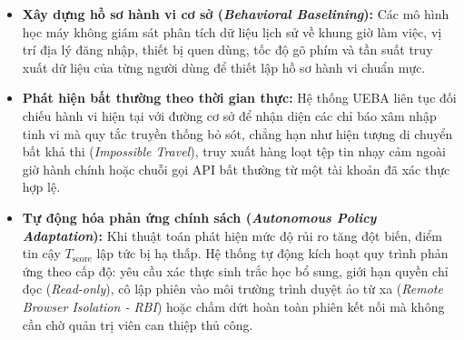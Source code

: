 \begin{itemize}
    \item \textbf{Xây dựng hồ sơ hành vi cơ sở (\textit{Behavioral Baselining}):} Các mô hình học máy không giám sát phân tích dữ liệu lịch sử về khung giờ làm việc, vị trí địa lý đăng nhập, thiết bị quen dùng, tốc độ gõ phím và tần suất truy xuất dữ liệu của từng người dùng để thiết lập hồ sơ hành vi chuẩn mực.
    \item \textbf{Phát hiện bất thường theo thời gian thực:} Hệ thống UEBA liên tục đối chiếu hành vi hiện tại với đường cơ sở để nhận diện các chỉ báo xâm nhập tinh vi mà quy tắc truyền thống bỏ sót, chẳng hạn như hiện tượng di chuyển bất khả thi (\textit{Impossible Travel}), truy xuất hàng loạt tệp tin nhạy cảm ngoài giờ hành chính hoặc chuỗi gọi API bất thường từ một tài khoản đã xác thực hợp lệ.
    \item \textbf{Tự động hóa phản ứng chính sách (\textit{Autonomous Policy Adaptation}):} Khi thuật toán phát hiện mức độ rủi ro tăng đột biến, điểm tin cậy $T_{\text{score}}$ lập tức bị hạ thấp. Hệ thống tự động kích hoạt quy trình phản ứng theo cấp độ: yêu cầu xác thực sinh trắc học bổ sung, giới hạn quyền chỉ đọc (\textit{Read-only}), cô lập phiên vào môi trường trình duyệt ảo từ xa (\textit{Remote Browser Isolation - RBI}) hoặc chấm dứt hoàn toàn phiên kết nối mà không cần chờ quản trị viên can thiệp thủ công.
\end{itemize}